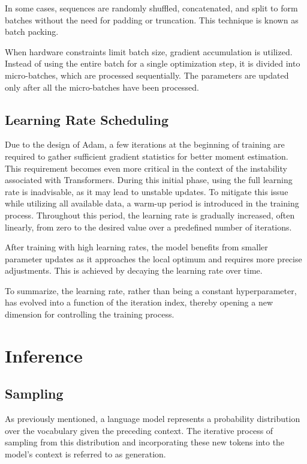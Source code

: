 In some cases, sequences are randomly shuffled, concatenated, and split to form batches without the need for padding or truncation. This technique is known as batch packing.

When hardware constraints limit batch size, gradient accumulation is utilized. Instead of using the entire batch for a single optimization step, it is divided into micro-batches, which are processed sequentially. The parameters are updated only after all the micro-batches have been processed.

\subsection{Learning Rate Scheduling}

Due to the design of Adam, a few iterations at the beginning of training are required to gather sufficient gradient statistics for better moment estimation. This requirement becomes even more critical in the context of the instability associated with Transformers. During this initial phase, using the full learning rate is inadvisable, as it may lead to unstable updates. To mitigate this issue while utilizing all available data, a warm-up period is introduced in the training process. Throughout this period, the learning rate is gradually increased, often linearly, from zero to the desired value over a predefined number of iterations.

After training with high learning rates, the model benefits from smaller parameter updates as it approaches the local optimum and requires more precise adjustments. This is achieved by decaying the learning rate over time.

To summarize, the learning rate, rather than being a constant hyperparameter, has evolved into a function of the iteration index, thereby opening a new dimension for controlling the training process.

\section{Inference}


\subsection{Sampling}\label{sec:sampling}

As previously mentioned, a language model represents a probability distribution over the vocabulary given the preceding context. The iterative process of sampling from this distribution and incorporating these new tokens into the model's context is referred to as generation.

